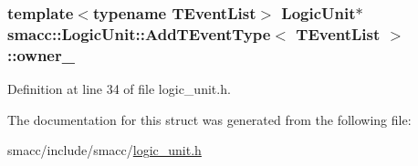 \subsubsection[{\texorpdfstring{owner\+\_\+}{owner_}}]{\setlength{\rightskip}{0pt plus 5cm}template$<$typename T\+Event\+List$>$ {\bf Logic\+Unit}$\ast$ {\bf smacc\+::\+Logic\+Unit\+::\+Add\+T\+Event\+Type}$<$ T\+Event\+List $>$\+::owner\+\_\+}\hypertarget{structsmacc_1_1LogicUnit_1_1AddTEventType_a6da43b333ecdf77bde453cd289b4d325}{}\label{structsmacc_1_1LogicUnit_1_1AddTEventType_a6da43b333ecdf77bde453cd289b4d325}


Definition at line 34 of file logic\+\_\+unit.\+h.



The documentation for this struct was generated from the following file\+:\begin{DoxyCompactItemize}
\item 
smacc/include/smacc/\hyperlink{logic__unit_8h}{logic\+\_\+unit.\+h}\end{DoxyCompactItemize}
